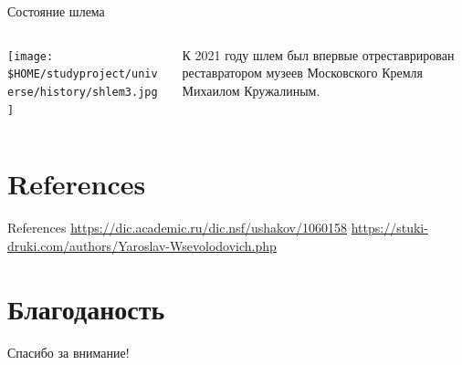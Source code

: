 \begin{frame}{Состояние шлема}
	\begin{columns}
		\begin{column}{0.45\textwidth}
			\texttt{[image: \$HOME/studyproject/universe/history/shlem3.jpg]}
		\end{column}
		\begin{column}{0.45\textwidth}

			К 2021 году шлем был впервые отреставрирован реставратором музеев Московского Кремля Михаилом Кружалиным.

		\end{column}
	\end{columns}
\end{frame}

\section{References}

\begin{frame}[t]{References}
	\printbibliography
	\url{https://dic.academic.ru/dic.nsf/ushakov/1060158}
	\url{https://stuki-druki.com/authors/Yaroslav-Wsevolodovich.php}
\end{frame}

\section{Благоданость}
\begin{frame}
	\centering
	\huge
	Спасибо за внимание!
\end{frame}


